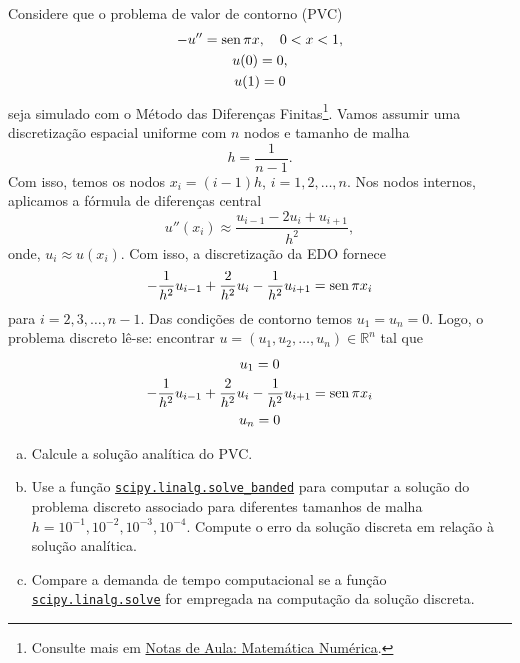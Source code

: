 \begin{exer}
  Considere que o problema de valor de contorno (PVC)
  \begin{gather}
    -u'' = \operatorname{sen} \pi x,\quad 0 < x < 1,\\
    u(0) = 0,\\
    u(1) = 0
  \end{gather}
  seja simulado com o Método das Diferenças Finitas\footnote{Consulte mais em \href{https://phkonzen.github.io/notas/MatematicaNumerica/cap_pvc_sec_mdf.html}{Notas de Aula: Matemática Numérica}.}. Vamos assumir uma discretização espacial uniforme com $n$ nodos e tamanho de malha
  \begin{equation}
    h = \frac{1}{n-1}.
  \end{equation}
  Com isso, temos os nodos $x_i = (i-1)h$, $i=1,2,\dotsc,n$. Nos nodos internos, aplicamos a fórmula de diferenças central
  \begin{equation}
    u''(x_i) \approx \frac{u_{i-1} - 2u_i + u_{i+1}}{h^2},
  \end{equation}
  onde, $u_i \approx u(x_i)$. Com isso, a discretização da EDO fornece
  \begin{equation}
    -\frac{1}{h^2}u_{i-1} + \frac{2}{h^2}u_i - \frac{1}{h^2}u_{i+1} = \operatorname{sen} \pi x_i
  \end{equation}
  para $i=2,3,\dotsc,n-1$. Das condições de contorno temos $u_1 = u_n = 0$. Logo, o problema discreto lê-se: encontrar $u = (u_1,u_2,\dotsc,u_n)\in \mathbb{R}^n$ tal que
  \begin{gather}
    u_1 = 0\\
    -\frac{1}{h^2}u_{i-1} + \frac{2}{h^2}u_i - \frac{1}{h^2}u_{i+1} = \operatorname{sen} \pi x_i\\
    u_n = 0
  \end{gather}
  \begin{enumerate}[a)]
  \item Calcule a solução analítica do PVC.
  \item Use a função \href{https://docs.scipy.org/doc/scipy/reference/generated/scipy.linalg.solve_banded.html}{\lstinline+scipy.linalg.solve_banded+} para computar a solução do problema discreto associado para diferentes tamanhos de malha $h = 10^{-1}, 10^{-2}, 10^{-3}, 10^{-4}$. Compute o erro da solução discreta em relação à solução analítica.
  \item Compare a demanda de tempo computacional se a função \href{https://docs.scipy.org/doc/scipy/reference/generated/scipy.linalg.solve.html}{\lstinline+scipy.linalg.solve+} for empregada na computação da solução discreta.
  \end{enumerate}
\end{exer}

